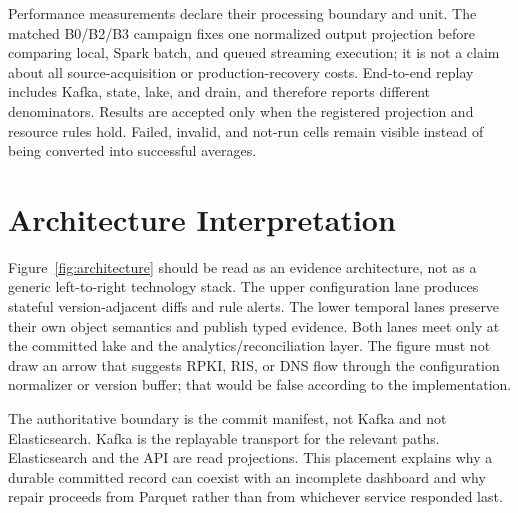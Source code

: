 Performance measurements declare their processing boundary and unit. The matched B0/B2/B3 campaign fixes one normalized output projection before comparing local, Spark batch, and queued streaming execution; it is not a claim about all source-acquisition or production-recovery costs. End-to-end replay includes Kafka, state, lake, and drain, and therefore reports different denominators. Results are accepted only when the registered projection and resource rules hold. Failed, invalid, and not-run cells remain visible instead of being converted into successful averages.

\section{Architecture Interpretation}
\label{sec:architecture-interpretation}

Figure~\ref{fig:architecture} should be read as an evidence architecture, not as a generic left-to-right technology stack. The upper configuration lane produces stateful version-adjacent diffs and rule alerts. The lower temporal lanes preserve their own object semantics and publish typed evidence. Both lanes meet only at the committed lake and the analytics/reconciliation layer. The figure must not draw an arrow that suggests RPKI, RIS, or DNS flow through the configuration normalizer or version buffer; that would be false according to the implementation.

The authoritative boundary is the commit manifest, not Kafka and not Elasticsearch. Kafka is the replayable transport for the relevant paths. Elasticsearch and the API are read projections. This placement explains why a durable committed record can coexist with an incomplete dashboard and why repair proceeds from Parquet rather than from whichever service responded last.
